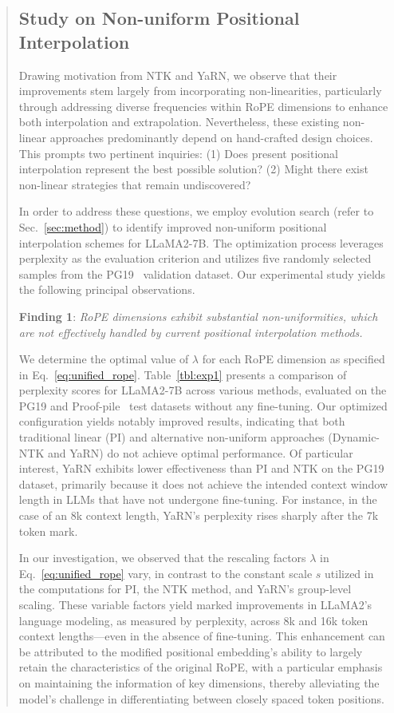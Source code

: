\begin{abstract}
\subsection{Study on Non-uniform Positional Interpolation}

Drawing motivation from NTK and YaRN, we observe that their improvements stem largely from incorporating non-linearities, particularly through addressing diverse frequencies within RoPE dimensions to enhance both interpolation and extrapolation. Nevertheless, these existing non-linear approaches predominantly depend on hand-crafted design choices. This prompts two pertinent inquiries: (1) Does present positional interpolation represent the best possible solution? (2) Might there exist non-linear strategies that remain undiscovered?

In order to address these questions, we employ evolution search (refer to Sec.~\ref{sec:method}) to identify improved non-uniform positional interpolation schemes for LLaMA2-7B. The optimization process leverages perplexity as the evaluation criterion and utilizes five randomly selected samples from the PG19~\cite{pg19} validation dataset. Our experimental study yields the following principal observations.

\textbf{Finding 1}: \textit{RoPE dimensions exhibit substantial non-uniformities, which are not effectively handled by current positional interpolation methods.}

We determine the optimal value of $\lambda$ for each RoPE dimension as specified in Eq.~\ref{eq:unified_rope}. Table~\ref{tbl:exp1} presents a comparison of perplexity scores for LLaMA2-7B across various methods, evaluated on the PG19 and Proof-pile~\cite{proof-pile} test datasets without any fine-tuning. Our optimized configuration yields notably improved results, indicating that both traditional linear (PI) and alternative non-uniform approaches (Dynamic-NTK and YaRN) do not achieve optimal performance. Of particular interest, YaRN exhibits lower effectiveness than PI and NTK on the PG19 dataset, primarily because it does not achieve the intended context window length in LLMs that have not undergone fine-tuning. For instance, in the case of an 8k context length, YaRN's perplexity rises sharply after the 7k token mark.

In our investigation, we observed that the rescaling factors $\lambda$ in Eq.~\ref{eq:unified_rope} vary, in contrast to the constant scale $s$ utilized in the computations for PI, the NTK method, and YaRN's group-level scaling. These variable factors yield marked improvements in LLaMA2’s language modeling, as measured by perplexity, across 8k and 16k token context lengths—even in the absence of fine-tuning. This enhancement can be attributed to the modified positional embedding’s ability to largely retain the characteristics of the original RoPE, with a particular emphasis on maintaining the information of key dimensions, thereby alleviating the model’s challenge in differentiating between closely spaced token positions.


\end{abstract}
